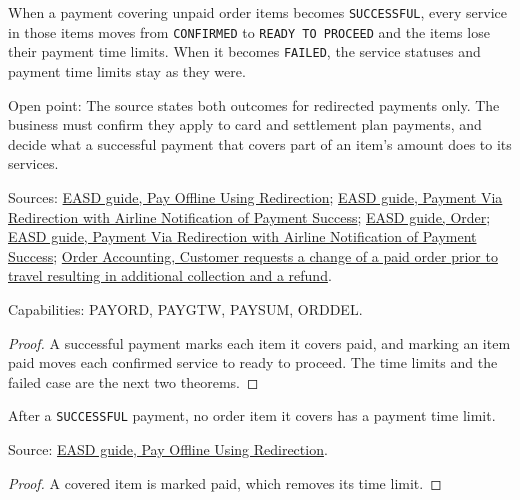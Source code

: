 \begin{theorem}
  \label{thm:payment-payment-outcome-effects}
  When a payment covering unpaid order items becomes \texttt{SUCCESSFUL},
  every service in those items moves from \texttt{CONFIRMED} to
  \texttt{READY TO PROCEED} and the items lose their payment time limits.
  When it becomes \texttt{FAILED}, the service statuses and payment time
  limits stay as they were.

  Open point: The source states both outcomes for redirected payments only.
  The business must confirm they apply to card and settlement plan payments,
  and decide what a successful payment that covers part of an item's amount
  does to its services.

  Sources: \href{https://standards.atlassian.net/wiki/spaces/EASD/pages/574455927/Pay+Offline+Using+Redirection}{EASD guide, Pay Offline Using Redirection};
  \href{https://standards.atlassian.net/wiki/spaces/EASD/pages/670203914/Payment+Via+Redirection+with+Airline+Notification+of+Payment+Success}{EASD guide, Payment Via Redirection with Airline Notification of Payment Success​};
  \href{https://standards.atlassian.net/wiki/spaces/EASD/pages/574849062/Order}{EASD guide, Order};
  \href{https://standards.atlassian.net/wiki/spaces/EASD/pages/670203914}{EASD guide, Payment Via Redirection with Airline Notification of Payment Success​};
  \href{https://standards.atlassian.net/wiki/spaces/OA/pages/844202130}{Order Accounting, Customer requests a change of a paid order prior to travel resulting in additional collection and a refund}.

  Capabilities: PAYORD, PAYGTW, PAYSUM, ORDDEL.
\end{theorem}
\begin{proof}
  A successful payment marks each item it covers paid, and marking an item
  paid moves each confirmed service to ready to proceed.  The time limits and
  the failed case are the next two theorems.
\end{proof}

\begin{theorem}
  \label{thm:payment-outcome-time-limit}
  After a \texttt{SUCCESSFUL} payment, no order item it covers has a payment
  time limit.

  Source: \href{https://standards.atlassian.net/wiki/spaces/EASD/pages/574455927/Pay+Offline+Using+Redirection}{EASD guide, Pay Offline Using Redirection}.
\end{theorem}
\begin{proof}
  A covered item is marked paid, which removes its time limit.
\end{proof}

